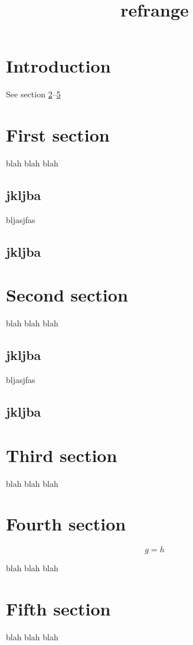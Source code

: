 \documentclass{amsart}
\title{refrange}
\providecommand\refRange[2]{\ref{#1}--\ref{#2}}
\begin{document}
\maketitle

\section{Introduction}\label{sec:1}

See section \refRange{sec:2}{sec:5}

\section{First section}\label{sec:2}

blah blah blah

\subsection{jkljba}\label{ssec:1}

bljasjfas

\subsection{jkljba}\label{ssec:2}

\section{Second section}\label{sec:3}

blah blah blah

\subsection{jkljba}\label{ssec:3}

bljasjfas

\subsection{jkljba}\label{ssec:4}

\section{Third section}\label{sec:4}

blah blah blah

\section{Fourth section}\label{sec:5}

\begin{equation}\label{eq:4}
g = h
\end{equation}

blah blah blah

\section{Fifth section}\label{sec:6}

blah blah blah
\end{document}
